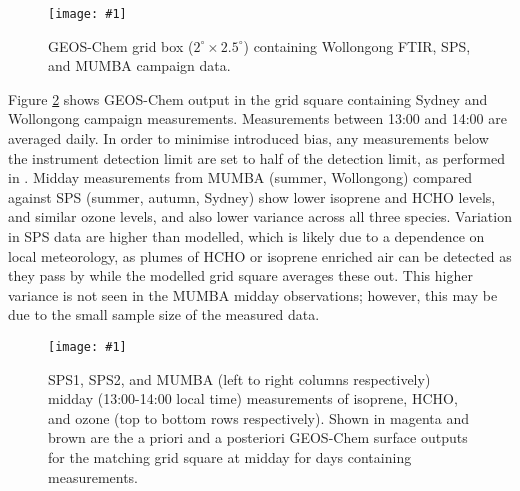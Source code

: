 \documentclass[acp, manuscript]{copernicus}
\newcommand{\textcite}{\citet}
\newcommand{\lowhr}{$2^{\circ} \times 2.5^{\circ}$}
\newcommand{\mypic}[3]{%
  \begin{figure}
    \texttt{[image: \#1]}
    \caption{#2}
    #3
  \end{figure}
}
\begin{document}
    \mypic{Figures/gridmapsmall_sites.png}{%
      GEOS-Chem grid box (\lowhr) containing Wollongong FTIR, SPS, and MUMBA campaign data.
    }{\label{BioIsop:results:measurements:fig_gridbox}}
    
    
    Figure \ref{BioIsop:results:measurements:fig_campaign_comparison} shows GEOS-Chem output in the grid square containing Sydney and Wollongong campaign measurements.
    Measurements between 13:00 and 14:00 are averaged daily.
    In order to minimise introduced bias, any measurements below the instrument detection limit are set to half of the detection limit, as performed in \textcite{Lawson2015}. 
    Midday measurements from MUMBA (summer, Wollongong) compared against SPS (summer, autumn, Sydney) show lower isoprene and HCHO levels, and similar ozone levels, and also lower variance across all three species.
    Variation in SPS data are higher than modelled, which is likely due to a dependence on local meteorology, as plumes of HCHO or isoprene enriched air can be detected as they pass by while the modelled grid square averages these out.
    This higher variance is not seen in the MUMBA midday observations; however, this may be due to the small sample size of the measured data.
    
    
    
    
    \mypic{Figures/GC_VS_CAMPAIGNS_midday.png}{%
      SPS1, SPS2, and MUMBA (left to right columns respectively) midday (13:00-14:00 local time) measurements of isoprene, HCHO, and ozone (top to bottom rows respectively).
      Shown in magenta and brown are the a priori and a posteriori GEOS-Chem surface outputs for the matching grid square at midday for days containing measurements.
    }{\label{BioIsop:results:measurements:fig_campaign_comparison}}
    
\end{document}

